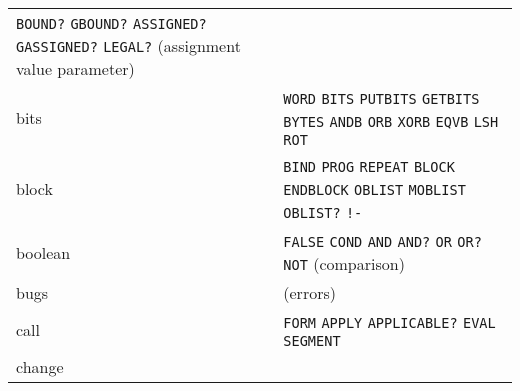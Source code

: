 \documentclass[a4paper]{scrbook}
\begin{document}
\begin{longtable}[]{@{}ll@{}}
\begin{minipage}[t]{0.83\columnwidth}
\texttt{BOUND?} \texttt{GBOUND?} \texttt{ASSIGNED?} \texttt{GASSIGNED?} \texttt{LEGAL?} (assignment value parameter)\strut
\end{minipage}\tabularnewline
\begin{minipage}[t]{0.11\columnwidth}\raggedright\strut
bits\strut
\end{minipage} & \begin{minipage}[t]{0.83\columnwidth}\raggedright\strut
\texttt{WORD} \texttt{BITS} \texttt{PUTBITS} \texttt{GETBITS} \texttt{BYTES} \texttt{ANDB} \texttt{ORB} \texttt{XORB}
\texttt{EQVB} \texttt{LSH} \texttt{ROT}\strut
\end{minipage}\tabularnewline
\begin{minipage}[t]{0.11\columnwidth}\raggedright\strut
block\strut
\end{minipage} & \begin{minipage}[t]{0.83\columnwidth}\raggedright\strut
\texttt{BIND} \texttt{PROG} \texttt{REPEAT} \texttt{BLOCK} \texttt{ENDBLOCK} \texttt{OBLIST} \texttt{MOBLIST}
\texttt{OBLIST?} \texttt{!-}\strut
\end{minipage}\tabularnewline
\begin{minipage}[t]{0.11\columnwidth}\raggedright\strut
boolean\strut
\end{minipage} & \begin{minipage}[t]{0.83\columnwidth}\raggedright\strut
\texttt{FALSE} \texttt{COND} \texttt{AND} \texttt{AND?} \texttt{OR} \texttt{OR?} \texttt{NOT} (comparison)\strut
\end{minipage}\tabularnewline
\begin{minipage}[t]{0.11\columnwidth}\raggedright\strut
bugs\strut
\end{minipage} & \begin{minipage}[t]{0.83\columnwidth}\raggedright\strut
(errors)\strut
\end{minipage}\tabularnewline
\begin{minipage}[t]{0.11\columnwidth}\raggedright\strut
call\strut
\end{minipage} & \begin{minipage}[t]{0.83\columnwidth}\raggedright\strut
\texttt{FORM} \texttt{APPLY} \texttt{APPLICABLE?} \texttt{EVAL} \texttt{SEGMENT}\strut
\end{minipage}\tabularnewline
\begin{minipage}[t]{0.11\columnwidth}\raggedright\strut
change\strut
\end{minipage} & \begin{minipage}[t]{0.83\columnwidth}\raggedright\strut

\end{minipage}
\end{longtable}
\end{document}
